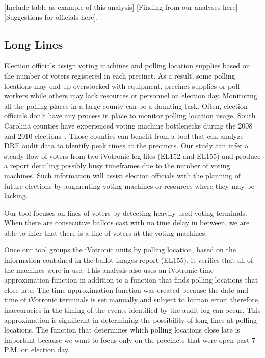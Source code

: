 [Include table as example of this analysis] [Finding from our analyses here] [Suggestions for officials here].

\subsection{Long Lines}

Election officials assign voting machines and polling location supplies based on the number of voters registered in each precinct.  As a result, some polling locations may end up overstocked with equipment, precinct supplies or poll workers while others may lack resources or personnel on election day. Monitoring all the polling places in a large county can be a daunting task. Often, election officials don't have any process in place to monitor polling location usage. South Carolina counties have experienced voting machine bottlenecks during the 2008 and 2010 elections~\cite{Kreitman2010, Slade2008, U2010}.  Those counties can benefit from a tool that can analyze DRE audit data to identify peak times at the precincts.  Our study can infer a steady flow of voters from two iVotronic log files (EL152 and EL155) and produce a report detailing possibly busy timeframes due to the number of voting machines. Such information will assist election officials with the planning of future elections by augmenting voting machines or resources where they may be lacking.

Our tool focuses on lines of voters by detecting heavily used voting terminals. When there are consecutive ballots cast with no time delay in between, we are able to infer that there is a line of voters at the voting machines. 

Once our tool groups the iVotronic units by polling location, based on the information contained in the ballot images report (EL155), it verifies that all of the machines were in use. This analysis also uses an iVotronic time approximation function in addition to a function that finds polling locations that close late. The time approximation function was created because the date and time of iVotronic terminals is set manually and subject to human error; therefore, inaccuracies in the timing of the events identified by the audit log can occur.  This approximation is significant in determining the possibility of long lines at polling locations.  The function that determines which polling locations close late is important because we want to focus only on the precincts that were open past 7 P.M. on election day.

